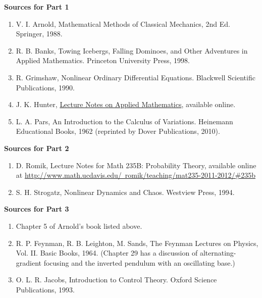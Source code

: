 \documentclass[11pt]{report}
\theoremstyle{plain}
\theoremstyle{definition}
\begin{document}
\textbf{Sources for Part 1}

\begin{enumerate}[label=\arabic*.]
\item V. I. Arnold, Mathematical Methods of Classical
Mechanics, 2nd Ed. Springer, 1988.

\item R. B. Banks, Towing Icebergs, Falling Dominoes, and
Other Adventures in Applied Mathematics. Princeton
University Press, 1998.

\item R. Grimshaw, Nonlinear Ordinary Differential
Equations. Blackwell Scientific Publications, 1990.

\item J. K. Hunter, \href{http://www.math.ucdavis.edu/~hunter/m280_09/applied_math.html}{Lecture Notes on Applied
Mathematics},
available online.

\item L. A. Pars, An Introduction to the Calculus of
Variations. Heinemann Educational Books, 1962
(reprinted by Dover Publications, 2010).
\end{enumerate}

\noindent \textbf{Sources for Part 2}

\begin{enumerate}[label=\arabic*., start=6]
\item D. Romik, Lecture Notes for Math 235B: Probability
Theory, available online at
\href{http://www.math.ucdavis.edu/~romik/teaching/mat235-2011-2012/\#235b}{http://www.math.ucdavis.edu/~romik/teaching/mat235-2011-2012/\#235b}

\item S. H. Strogatz, Nonlinear Dynamics and Chaos. Westview
Press, 1994.
\end{enumerate}

\noindent \textbf{Sources for Part 3}

\begin{enumerate}[label=\arabic*., start=8]
\item Chapter 5 of Arnold's book listed above.

\item R. P. Feynman, R. B. Leighton, M. Sands, The Feynman
Lectures on Physics, Vol. II. Basic Books, 1964.
(Chapter 29 has a discussion of alternating-gradient
focusing and the inverted pendulum with an oscillating
base.)

\item O. L. R. Jacobs, Introduction to Control Theory.
Oxford Science Publications, 1993.
\end{enumerate}
\end{document}
